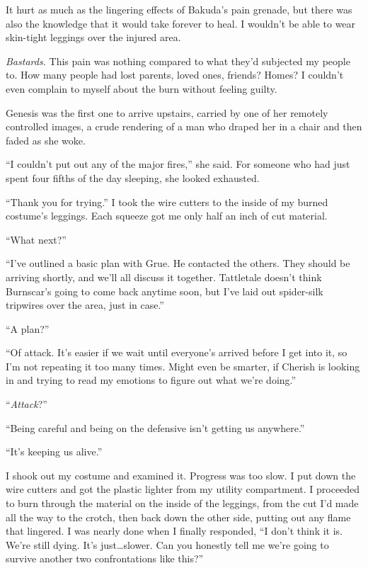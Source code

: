 It hurt as much as the lingering effects of Bakuda's pain grenade, but there was also the knowledge that it would take forever to heal.  I wouldn't be able to wear skin-tight leggings over the injured area.



\emph{Bastards.  }This pain was nothing compared to what they'd subjected my people to.  How many people had lost parents, loved ones, friends?  Homes?  I couldn't even complain to myself about the burn without feeling guilty.



Genesis was the first one to arrive upstairs, carried by one of her remotely controlled images, a crude rendering of a man who draped her in a chair and then faded as she woke.



``I couldn't put out any of the major fires,'' she said.  For someone who had just spent four fifths of the day sleeping, she looked exhausted.



``Thank you for trying.''  I took the wire cutters to the inside of my burned costume's leggings.  Each squeeze got me only half an inch of cut material.



``What next?''



``I've outlined a basic plan with Grue.  He contacted the others.  They should be arriving shortly, and we'll all discuss it together.  Tattletale doesn't think Burnscar's going to come back anytime soon, but I've laid out spider-silk tripwires over the area, just in case.''



``A plan?''



``Of attack.  It's easier if we wait until everyone's arrived before I get into it, so I'm not repeating it too many times.  Might even be smarter, if Cherish is looking in and trying to read my emotions to figure out what we're doing.''



``\emph{Attack}?''



``Being careful and being on the defensive isn't getting us anywhere.''



``It's keeping us alive.''



I shook out my costume and examined it.  Progress was too slow.  I put down the wire cutters and got the plastic lighter from my utility compartment.  I proceeded to burn through the material on the inside of the leggings, from the cut I'd made all the way to the crotch, then back down the other side, putting out any flame that lingered.  I was nearly done when I finally responded,  ``I don't think it is.  We're still dying.  It's just\ldots slower.  Can you honestly tell me we're going to survive another two confrontations like this?''



